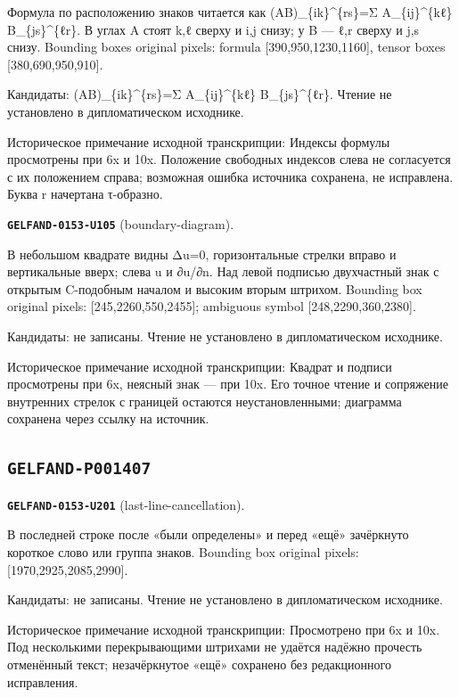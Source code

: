 Формула по расположению знаков читается как (AB)\_\{ik\}\textasciicircum{}\{rs\}=Σ A\_\{ij\}\textasciicircum{}\{kℓ\} B\_\{js\}\textasciicircum{}\{ℓr\}. В углах A стоят k,ℓ сверху и i,j снизу; у B — ℓ,r сверху и j,s снизу. Bounding boxes original pixels: formula [390,950,1230,1160], tensor boxes [380,690,950,910].\par
Кандидаты: (AB)\_\{ik\}\textasciicircum{}\{rs\}=Σ A\_\{ij\}\textasciicircum{}\{kℓ\} B\_\{js\}\textasciicircum{}\{ℓr\}. Чтение не установлено в дипломатическом исходнике.\par
Историческое примечание исходной транскрипции: Индексы формулы просмотрены при 6x и 10x. Положение свободных индексов слева не согласуется с их положением справа; возможная ошибка источника сохранена, не исправлена. Буква r начертана τ-образно.\par\medskip
\par\noindent\leavevmode{}\label{GELFAND-0153-U105}\textbf{\texttt{GELFAND-0153-U105}} (boundary-diagram).\nopagebreak[4]\par
В небольшом квадрате видны Δu=0, горизонтальные стрелки вправо и вертикальные вверх; слева u и ∂u/∂n. Над левой подписью двухчастный знак с открытым C-подобным началом и высоким вторым штрихом. Bounding box original pixels: [245,2260,550,2455]; ambiguous symbol [248,2290,360,2380].\par
Кандидаты: не записаны. Чтение не установлено в дипломатическом исходнике.\par
Историческое примечание исходной транскрипции: Квадрат и подписи просмотрены при 6x, неясный знак — при 10x. Его точное чтение и сопряжение внутренних стрелок с границей остаются неустановленными; диаграмма сохранена через ссылку на источник.\par\medskip
\subsection*{\texttt{GELFAND-P001407}}
\par\noindent\leavevmode{}\label{GELFAND-0153-U201}\textbf{\texttt{GELFAND-0153-U201}} (last-line-cancellation).\nopagebreak[4]\par
В последней строке после «были определены» и перед «ещё» зачёркнуто короткое слово или группа знаков. Bounding box original pixels: [1970,2925,2085,2990].\par
Кандидаты: не записаны. Чтение не установлено в дипломатическом исходнике.\par
Историческое примечание исходной транскрипции: Просмотрено при 6x и 10x. Под несколькими перекрывающими штрихами не удаётся надёжно прочесть отменённый текст; незачёркнутое «ещё» сохранено без редакционного исправления.\par\medskip

